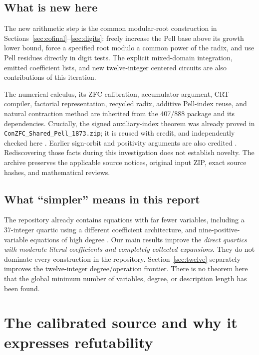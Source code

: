 \documentclass[10pt,letterpaper]{article}
\theoremstyle{remark}\newtheorem{remark}[theorem]{Remark}
\newcommand{\file}[1]{\texttt{\nolinkurl{#1}}}
\begin{document}
\subsection{What is new here}

The new arithmetic step is the common modular-root construction in
Sections~\ref{sec:cofinal}--\ref{sec:digits}: freely increase the Pell
base above its growth lower bound, force a specified root modulo a
common power of the radix, and use Pell residues directly in digit
tests. The explicit mixed-domain integration, emitted coefficient lists,
and new twelve-integer centered circuits are also contributions of this
iteration.

The numerical calculus, its ZFC calibration, accumulator argument, CRT
compiler, factorial representation, recycled radix, additive Pell-index
reuse, and natural contraction method are inherited from the 407/888
package and its dependencies. Crucially, the signed auxiliary-index
theorem was already proved in \file{ConZFC_Shared_Pell_1873.zip}; it is
reused with credit, and independently checked here \cite{signed}.
Earlier sign-orbit and positivity arguments are also credited
\cite{signedcompiler}. Rediscovering those facts during this investigation
does not establish novelty. The archive preserves the applicable source
notices, original input ZIP, exact source hashes, and mathematical reviews.

\subsection{What ``simpler'' means in this report}

The repository already contains equations with far fewer variables,
including a 37-integer quartic using a different coefficient architecture,
and nine-positive-variable equations of high degree \cite{joint,repo}.
Our main results improve the \emph{direct quartics with moderate literal
coefficients and completely collected expansions}. They do not dominate
every construction in the repository. Section~\ref{sec:twelve} separately
improves the twelve-integer degree/operation frontier. There is no theorem
here that the global minimum number of variables, degree, or description
length has been found.

\section{The calibrated source and why it expresses refutability}
\label{sec:source}
\end{document}
